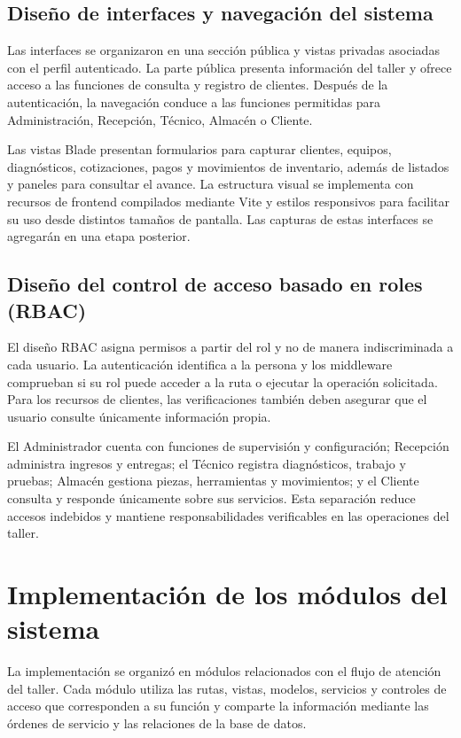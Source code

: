 \subsection{Diseño de interfaces y navegación del sistema}

Las interfaces se organizaron en una sección pública y vistas privadas asociadas con el perfil autenticado. La parte pública presenta información del taller y ofrece acceso a las funciones de consulta y registro de clientes. Después de la autenticación, la navegación conduce a las funciones permitidas para Administración, Recepción, Técnico, Almacén o Cliente.

Las vistas Blade presentan formularios para capturar clientes, equipos, diagnósticos, cotizaciones, pagos y movimientos de inventario, además de listados y paneles para consultar el avance. La estructura visual se implementa con recursos de frontend compilados mediante Vite y estilos responsivos para facilitar su uso desde distintos tamaños de pantalla. Las capturas de estas interfaces se agregarán en una etapa posterior.

\subsection{Diseño del control de acceso basado en roles (RBAC)}

El diseño RBAC asigna permisos a partir del rol y no de manera indiscriminada a cada usuario. La autenticación identifica a la persona y los middleware comprueban si su rol puede acceder a la ruta o ejecutar la operación solicitada. Para los recursos de clientes, las verificaciones también deben asegurar que el usuario consulte únicamente información propia.

El Administrador cuenta con funciones de supervisión y configuración; Recepción administra ingresos y entregas; el Técnico registra diagnósticos, trabajo y pruebas; Almacén gestiona piezas, herramientas y movimientos; y el Cliente consulta y responde únicamente sobre sus servicios. Esta separación reduce accesos indebidos y mantiene responsabilidades verificables en las operaciones del taller.

\section{Implementación de los módulos del sistema}

La implementación se organizó en módulos relacionados con el flujo de atención del taller. Cada módulo utiliza las rutas, vistas, modelos, servicios y controles de acceso que corresponden a su función y comparte la información mediante las órdenes de servicio y las relaciones de la base de datos.

